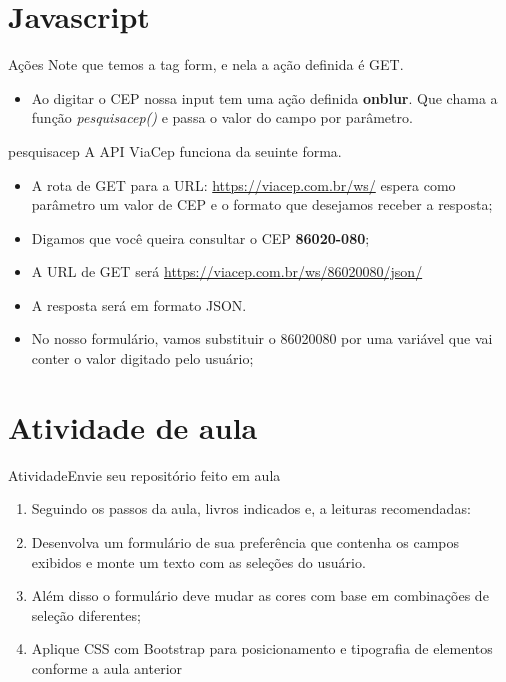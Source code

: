 \documentclass{beamer}
\begin{document}
\section{Javascript}
\begin{frame}{Ações}
Note que temos a tag form, e nela a ação definida é GET.
\\
\begin{itemize}
    \item Ao digitar o CEP nossa input tem uma ação definida \textbf{onblur}. Que chama a função \textit{pesquisacep()} e passa o valor do campo por parâmetro.
\end{itemize}
\end{frame}
\begin{frame}{pesquisacep}
A API ViaCep funciona da seuinte forma.
\\
\begin{itemize}
    \item A rota de GET para a URL: \url{https://viacep.com.br/ws/} espera como parâmetro um valor de CEP e o formato que desejamos receber a resposta;
    \item Digamos que você queira consultar o CEP \textbf{86020-080};
    \item A URL de GET será \url{https://viacep.com.br/ws/86020080/json/}
    \item A resposta será em formato JSON. 
    \item No nosso formulário, vamos substituir o 86020080 por uma variável que vai conter o valor digitado pelo usuário;
\end{itemize}
\end{frame}
\section{Atividade de aula}
\begin{frame}{Atividade}{Envie seu repositório feito em aula}
  \begin{enumerate}
      \item Seguindo os passos da aula, livros indicados e, a leituras recomendadas:
      \item Desenvolva um formulário de sua preferência que contenha os campos exibidos e monte um texto com as seleções do usuário.
      \item Além disso o formulário deve mudar as cores com base em combinações de seleção diferentes;
      \item Aplique CSS com Bootstrap para posicionamento e tipografia de elementos conforme a aula anterior
  \end{enumerate}


\end{frame}
\end{document}
